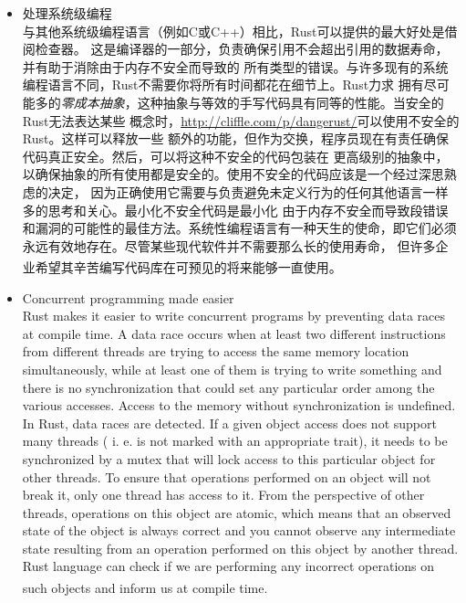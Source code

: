 \documentclass[UTF8,fontset=none,linespread=1.15]{ctexart}
\let\nosupcite\cite
\renewcommand*{\cite}[1]{\textsuperscript{\nosupcite{#1}}}
\begin{document}
\begin{itemize}
\item 处理系统级编程\\
  与其他系统级编程语言（例如C或C++）相比，Rust可以提供的最大好处是借阅检查器。
  这是编译器的一部分，负责确保引用不会超出引用的数据寿命，并有助于消除由于内存不安全而导致的
  所有类型的错误。与许多现有的系统编程语言不同，Rust不需要你将所有时间都花在细节上。Rust力求
  拥有尽可能多的\textit{零成本抽象}，这种抽象与等效的手写代码具有同等的性能。当安全的Rust无法表达某些
  概念时，\url{http://cliffle.com/p/dangerust/}可以使用不安全的 Rust。这样可以释放一些
  额外的功能，但作为交换，程序员现在有责任确保代码真正安全。然后，可以将这种不安全的代码包装在
  更高级别的抽象中，以确保抽象的所有使用都是安全的。使用不安全的代码应该是一个经过深思熟虑的决定，
  因为正确使用它需要与负责避免未定义行为的任何其他语言一样多的思考和关心。最小化不安全代码是最小化
  由于内存不安全而导致段错误和漏洞的可能性的最佳方法。系统性编程语言有一种天生的使命，即它们必须
  永远有效地存在。尽管某些现代软件并不需要那么长的使用寿命，
  但许多企业希望其辛苦编写代码库在可预见的将来能够一直使用。\cite{bib:3-why-rust-pop}

\item Concurrent programming made easier\\
  Rust makes it easier to write concurrent programs by preventing data races at
  compile time. A data race occurs when at least two different instructions from
  different threads are trying to access the same memory location simultaneously,
  while at least one of them is trying to write something and there is no synchronization
  that could set any particular order among the various accesses. Access to the memory
  without synchronization is undefined. In Rust, data races are detected. If a given
  object access does not support many threads ( i. e. is not marked with an appropriate
  trait), it needs to be synchronized by a mutex that will lock access to this particular
  object for other threads. To ensure that operations performed on an object will not
  break it, only one thread has access to it. From the perspective of other threads,
  operations on this object are atomic, which means that an observed state of the
  object is always correct and you cannot observe any intermediate state resulting
  from an operation performed on this object by another thread. Rust language can
  check if we are performing any incorrect operations on such objects and inform
  us at compile time.\cite{bib:6-why-rust-pop-2}
\end{itemize}
\end{document}
